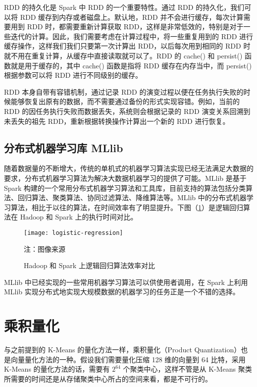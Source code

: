 RDD 的持久化是 Spark 中 RDD 的一个重要特性。通过 RDD 的持久化，我们可以将 RDD 缓存到内存或者磁盘上。默认地，RDD 并不会进行缓存，每次计算需要用到 RDD 时，都需要重新计算获取 RDD，这样是非常低效的，特别是对于一些迭代的计算。因此，我们需要考虑在计算过程中，将一些重复用到的 RDD 进行缓存操作，这样我们我们只要第一次计算出 RDD，以后每次用到相同的 RDD 时就不用在重复计算，从缓存中直接读取就可以了。RDD 的 cache() 和 persist() 函数就是用于缓存的，其中 cache() 函数是指将 RDD 缓存在内存当中，而 persist() 根据参数可以将 RDD 进行不同级别的缓存。

RDD 本身自带有容错机制，通过记录 RDD 的演变过程以便在任务执行失败的时候能够恢复出原有的数据，而不需要通过备份的形式实现容错。例如，当前的 RDD 的因任务执行失败而数据丢失，系统则会根据记录的 RDD 演变关系回溯到未丢失的祖先 RDD，重新根据转换操作计算出一个新的 RDD 进行恢复。
\subsection{分布式机器学习库 MLlib}
随着数据量的不断增大，传统的单机式的机器学习算法实现已经无法满足大数据的要求，分布式机器学习算法为解决大数据机器学习的提供了可能。MLlib 是基于 Spark 构建的一个常用分布式机器学习算法和工具库，目前支持的算法包括分类算法、回归算法、聚类算法、协同过滤算法、降维算法等。MLlib 中的分布式机器学习算法，相比于以往的算法，在时间效率有了明显提升。下图（\ref{fig:logistic-regression}）是逻辑回归算法在 Hadoop 和 Spark 上的执行时间对比。
\begin{figure}[H]
  \centering
  \texttt{[image: logistic-regression]}
  \caption{Hadoop 和 Spark 上逻辑回归算法效率对比}
  \label{fig:logistic-regression}
  \footnotesize 注：图像来源\protect\footnotemark
\end{figure}
MLlib 中已经实现的一些常用机器学习算法可以供使用者调用，在 Spark 上利用 MLlib 实现分布式地实现大规模数据的机器学习的任务正是一个不错的选择。
\section{乘积量化}
\label{sec:product_quantization}
与之前提到的 K-Means 的量化方法一样，乘积量化（Product Quantization）\cite{Herve_PQ}也是向量量化方法的一种。假设我们需要量化压缩 128 维的向量到 64 比特，采用 K-Means 的量化方法的话，需要有 $2^{64}$ 个聚类中心，这样不管是从 K-Means 聚类所需要的时间还是从存储聚类中心所占的空间来看，都是不可行的。

